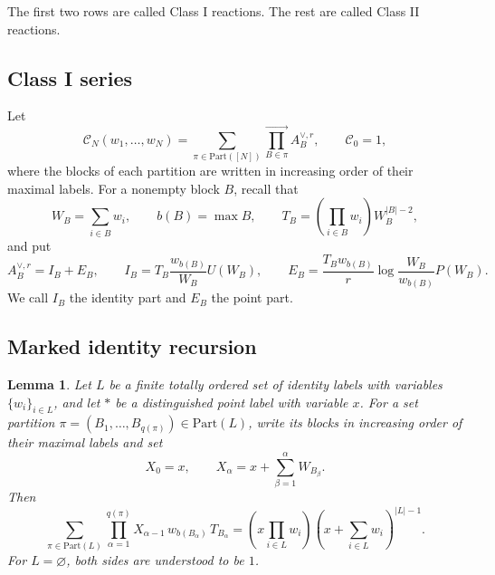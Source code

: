 \documentclass[letterpaper,12pt]{amsart}
\newtheorem{lem}[thm]{Lemma}
\theoremstyle{definition}
\newcommand{\Part}{\mathrm{Part}}
\newcommand{\scrC}{\mathscr C}
\numberwithin{equation}{section}
\begin{document}
The first two rows are called Class I reactions.  The rest are called Class II reactions.

\subsection{Class I series}
Let
\[
  \scrC_N(w_1,\ldots,w_N)
  =
  \sum_{\pi\in\Part([N])}
  \overrightarrow{\prod_{B\in\pi}} A_B^{\vee,r},
  \qquad
  \scrC_0=1,
\]
where the blocks of each partition are written in increasing order of their
maximal labels.  For a nonempty block \(B\), recall that
\[
  W_B=\sum_{i\in B}w_i,
  \qquad
  b(B)=\max B,
  \qquad
  T_B=\left(\prod_{i\in B}w_i\right)W_B^{|B|-2},
\]
and put
\[
  A_B^{\vee,r}=I_B+E_B,
  \qquad
  I_B=T_B\frac{w_{b(B)}}{W_B}U(W_B),
  \qquad
  E_B=\frac{T_Bw_{b(B)}}{r}
       \log\frac{W_B}{w_{b(B)}}P(W_B).
\]
We call $I_B$ the identity part and $E_B$ the point part.




\subsection{Marked identity recursion}
\begin{lem}\label{lem:point-absorption}
Let \(L\) be a finite totally ordered set of identity labels with variables
\(\{w_i\}_{i\in L}\), and let \(*\) be a distinguished point label with
variable \(x\).  For a set partition
\(\pi=(B_1,\ldots,B_{q(\pi)})\in \Part(L)\), write its blocks in increasing order
of their maximal labels and set
\[
  X_0=x,
  \qquad
  X_\alpha=x+\sum_{\beta=1}^{\alpha}W_{B_\beta}.
\]
Then
\begin{equation}
  \sum_{\pi\in\Part(L)}
  \prod_{\alpha=1}^{q(\pi)}
  X_{\alpha-1}\,w_{b(B_\alpha)}\,T_{B_\alpha}
  =
  \left(x\prod_{i\in L}w_i\right)
  \left(x+\sum_{i\in L}w_i\right)^{|L|-1}.
  \label{eq:point-absorption}
\end{equation}
For \(L=\varnothing\), both sides are understood to be \(1\).
\end{lem}
\end{document}
